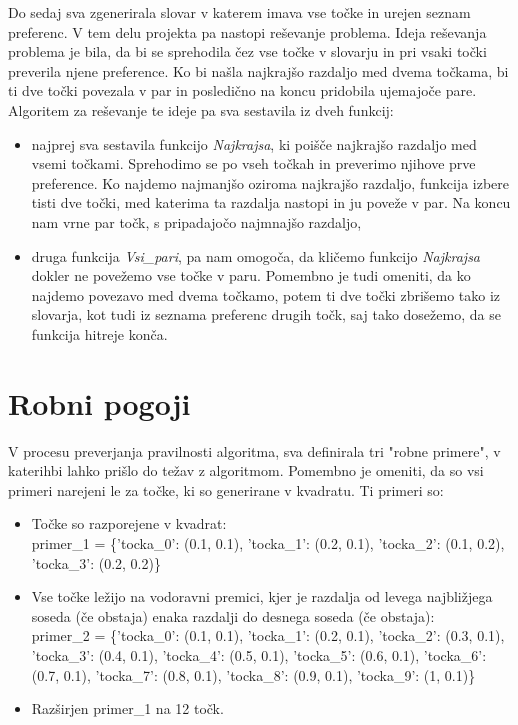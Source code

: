 \documentclass[12pt, a4paper]{article}
\begin{document}
Do sedaj sva zgenerirala slovar v katerem imava vse točke in urejen seznam preferenc.  V tem delu projekta pa nastopi reševanje problema. Ideja reševanja problema je bila, da bi se sprehodila čez vse točke v slovarju in pri vsaki točki preverila njene preference. Ko bi našla najkrajšo razdaljo med dvema točkama, bi ti dve točki povezala v par in posledično na koncu pridobila ujemajoče pare. Algoritem za reševanje te ideje pa sva sestavila iz dveh funkcij:
\begin{itemize}
	\item najprej sva sestavila funkcijo \textit{Najkrajsa}, ki poišče najkrajšo razdaljo med vsemi točkami. Sprehodimo se po vseh točkah in preverimo njihove prve preference. Ko najdemo najmanjšo oziroma najkrajšo razdaljo, funkcija izbere tisti dve točki, med katerima ta razdalja nastopi in ju poveže v par. Na koncu nam vrne par točk, s pripadajočo najmnajšo razdaljo,
	\item druga funkcija \textit{Vsi_pari}, pa nam omogoča, da kličemo funkcijo \textit{Najkrajsa} dokler ne povežemo vse točke v paru. Pomembno je tudi omeniti, da ko najdemo povezavo med dvema točkamo, potem ti dve točki zbrišemo tako iz slovarja, kot tudi iz seznama preferenc drugih točk, saj tako dosežemo, da se funkcija hitreje konča.
\end{itemize}


\section{Robni pogoji}
V procesu preverjanja pravilnosti algoritma, sva definirala tri "robne primere", v katerihbi lahko prišlo do težav z algoritmom. Pomembno je omeniti, da so vsi primeri narejeni le za točke, ki so generirane v kvadratu. Ti primeri so:
\begin{itemize}
\item Točke so razporejene v kvadrat:\\
	primer_1 = \{'tocka_0': (0.1, 0.1), 'tocka_1': (0.2, 0.1),  'tocka_2': (0.1,
	0.2),  'tocka_3': (0.2, 0.2)\}


\item Vse točke ležijo na vodoravni premici, kjer je razdalja od levega najbližjega soseda (če obstaja) enaka razdalji do desnega soseda (če obstaja):\\
	    primer_2 = \{'tocka_0': (0.1, 0.1), 'tocka_1': (0.2, 0.1), 'tocka_2': (0.3, 0.1),  'tocka_3': (0.4, 0.1),
           'tocka_4': (0.5, 0.1), 'tocka_5': (0.6, 0.1), 'tocka_6': (0.7, 0.1),  'tocka_7': (0.8, 0.1),
           'tocka_8': (0.9, 0.1), 'tocka_9': (1, 0.1)\}

\item Razširjen primer_1 na 12 točk.\\


\end{itemize} 
\end{document}
